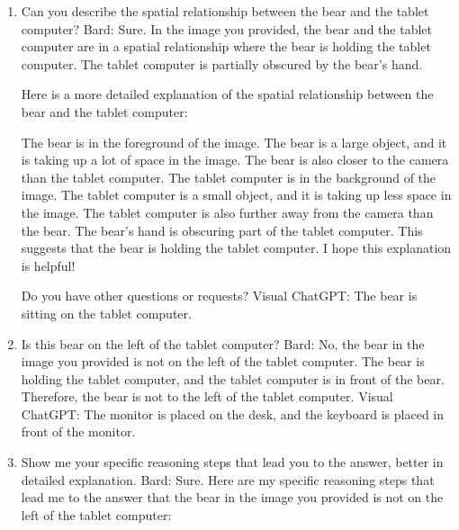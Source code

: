 \begin{enumerate}
    \item Can you describe the spatial relationship between the bear and the tablet computer?
    \subitem Bard: Sure. In the image you provided, the bear and the tablet computer are in a spatial relationship where the bear is holding the tablet computer. The tablet computer is partially obscured by the bear's hand.

    Here is a more detailed explanation of the spatial relationship between the bear and the tablet computer:
    
    The bear is in the foreground of the image. The bear is a large object, and it is taking up a lot of space in the image. The bear is also closer to the camera than the tablet computer.
    The tablet computer is in the background of the image. The tablet computer is a small object, and it is taking up less space in the image. The tablet computer is also further away from the camera than the bear.
    The bear's hand is obscuring part of the tablet computer. This suggests that the bear is holding the tablet computer.
    I hope this explanation is helpful!
    
    Do you have other questions or requests?    
    \subitem Visual ChatGPT: The bear is sitting on the tablet computer.
    \item Is this bear on the left of the tablet computer?
    \subitem Bard: 
    No, the bear in the image you provided is not on the left of the tablet computer. The bear is holding the tablet computer, and the tablet computer is in front of the bear. Therefore, the bear is not to the left of the tablet computer.
    \subitem Visual ChatGPT: The monitor is placed on the desk, and the keyboard is placed in front of the monitor.
    \item Show me your specific reasoning steps that lead you to the answer, better in detailed explanation.
    \subitem Bard: 
    Sure. Here are my specific reasoning steps that lead me to the answer that the bear in the image you provided is not on the left of the tablet computer:
    

\end{enumerate}
